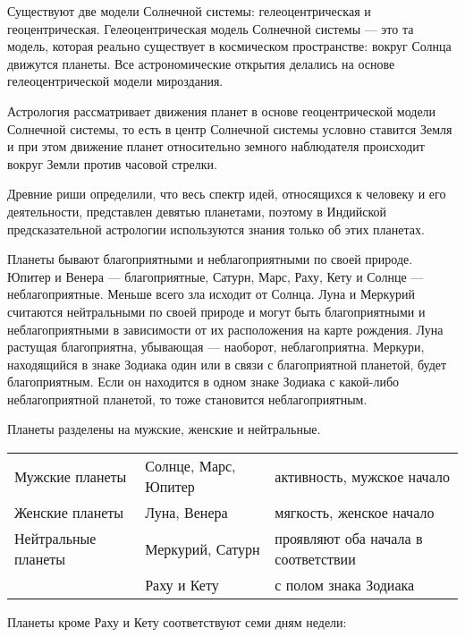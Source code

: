 Существуют две модели Солнечной системы: гелеоцентрическая и геоцентрическая. Гелеоцентрическая модель Солнечной системы --- это та модель, которая реально существует в космическом пространстве: вокруг Солнца движутся планеты. Все астрономические открытия делались на основе гелеоцентрической модели мироздания.

Астрология рассматривает движения планет в основе геоцентрической модели Солнечной системы, то есть в центр Солнечной системы условно ставится Земля и при этом движение планет относительно земного наблюдателя происходит вокруг Земли против часовой стрелки.

Древние риши определили, что весь спектр идей, относящихся к человеку и его деятельности, представлен девятью планетами, поэтому в Индийской предсказательной астрологии используются знания только об этих планетах.

Планеты бывают благоприятными и неблагоприятными по своей природе. Юпитер и Венера --- благоприятные, Сатурн, Марс, Раху, Кету и Солнце --- неблагоприятные. Меньше всего зла исходит от Солнца. Луна и Меркурий считаются нейтральными по своей природе и могут быть благоприятными и неблагоприятными в зависимости от их расположения на карте рождения. Луна растущая благоприятна, убывающая --- наоборот, неблагоприятна. Меркури, находящийся в знаке Зодиака один или в связи с благоприятной планетой, будет благоприятным. Если он находится в одном знаке Зодиака с какой-либо неблагоприятной планетой, то тоже становится неблагоприятным.

Планеты разделены на мужские, женские и нейтральные.

\begin{table}[tph!]
	\renewcommand{\arraystretch}{1}

	\begin{tabular}{l|l|l}
		Мужские планеты & Солнце, Марс, Юпитер & активность, мужское начало \\
		Женские планеты & Луна, Венера         & мягкость, женское начало \\
		Нейтральные планеты & Меркурий, Сатурн & проявляют оба начала в соответствии \\
		                     & Раху и Кету      & с полом знака Зодиака \\
	\end{tabular}
\end{table}


Планеты кроме Раху и Кету соответствуют семи дням недели:

